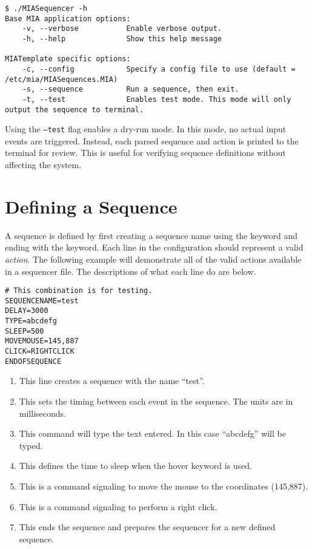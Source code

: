 \begin{lstlisting}[style=terminalstyle]
$ ./MIASequencer -h
Base MIA application options:
	-v, --verbose           Enable verbose output.
	-h, --help              Show this help message

MIATemplate specific options:
	-c, --config            Specify a config file to use (default = /etc/mia/MIASequences.MIA)
	-s, --sequence          Run a sequence, then exit.
	-t, --test              Enables test mode. This mode will only output the sequence to terminal.
\end{lstlisting}

Using the \texttt{--test} flag enables a dry-run mode. In this mode, no actual input events are triggered. Instead, each parsed sequence and action is printed to the terminal for review. This is useful for verifying sequence definitions without affecting the system.


\section{Defining a Sequence}

A sequence is defined by first creating a sequence name using the  keyword and ending with the  keyword. Each line in the configuration should represent a valid \textit{action}. The following example will demonstrate all of the valid actions available in a sequencer file. The descriptions of what each line do are below.

\begin{lstlisting}[style=pythonstyle]
# This combination is for testing.
SEQUENCENAME=test
DELAY=3000
TYPE=abcdefg
SLEEP=500
MOVEMOUSE=145,887
CLICK=RIGHTCLICK
ENDOFSEQUENCE
\end{lstlisting}

\begin{enumerate}
	\item {} This line creates a sequence with the name ``test''.
	\item {} This sets the timing between each event in the sequence. The units are in milliseconds.
	\item {} This command will type the text entered. In this case ``abcdefg'' will be typed.
	\item {} This defines the time to sleep when the hover keyword is used.
	\item {} This is a command signaling to move the mouse to the coordinates (145,887).
	\item {} This is a command signaling to perform a right click.
	\item {} This ends the sequence and prepares the sequencer for a new defined sequence.
\end{enumerate}

